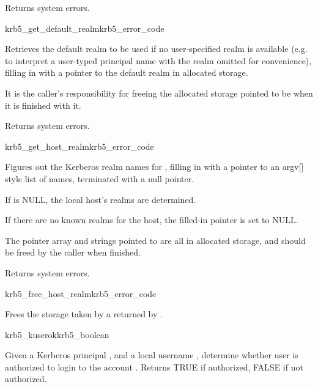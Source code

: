 Returns system errors.

\begin{funcdecl}{krb5_get_default_realm}{krb5_error_code}
\funcout
{}
\end{funcdecl}

Retrieves the default realm to be used if no user-specified realm is
available (e.g. to interpret a user-typed principal name with the
realm omitted for convenience), filling in  with a
pointer to the default realm in allocated storage.

It is the caller's responsibility for freeing the allocated storage
pointed to be  when it is finished with it.

Returns system errors.

\begin{funcdecl}{krb5_get_host_realm}{krb5_error_code}{\funcin}
\funcout
{}
\end{funcdecl}

Figures out the Kerberos realm names for , filling in
 with a
pointer to an argv[] style list of names, terminated with a null pointer.
 
If  is NULL, the local host's realms are determined.

If there are no known realms for the host, the filled-in pointer is set
to NULL.

The pointer array and strings pointed to are all in allocated storage,
and should be freed by the caller when finished.

Returns system errors.

\begin{funcdecl}{krb5_free_host_realm}{krb5_error_code}{\funcin}
\end{funcdecl}

Frees the storage taken by a  returned by
.

\begin{funcdecl}{krb5_kuserok}{krb5_boolean}{\funcin}
\end{funcdecl}

Given a Kerberos principal , and a local username
,
determine whether user is authorized to login to the account .
Returns TRUE if authorized, FALSE if not authorized.

